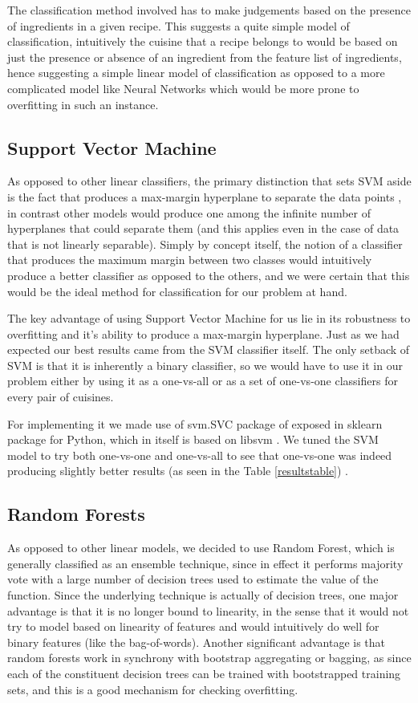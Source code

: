 \documentclass[prodmode,acmtap]{acmlarge}
\begin{document}
The classification method involved has to make judgements based on the presence of ingredients in a given recipe. This suggests a quite simple model of classification, intuitively the cuisine that a recipe belongs to would be based on just the presence or absence of an ingredient from the feature list of ingredients, hence suggesting a simple linear model of classification as opposed to a more complicated model like Neural Networks which would be more prone to overfitting in such an instance. 

\subsection{Support Vector Machine}

As opposed to other linear classifiers, the primary distinction that sets SVM aside is the fact that 
produces a max-margin hyperplane to separate the data points , in contrast other models would produce one among the infinite number of hyperplanes that could separate them (and this applies even in the case of data that is not linearly separable). Simply by concept itself, the notion of a classifier that produces the maximum margin between two classes would intuitively produce a better classifier as opposed to the others, and we were certain that this would be the ideal method for classification for our problem at hand.

The key advantage of using Support Vector Machine for us lie in its robustness to overfitting and it’s ability to produce a max-margin hyperplane. Just as we had expected our best results came from the SVM classifier itself. The only setback of SVM is that it is inherently a binary classifier, so we would have to use it in our problem either by using  it as a one-vs-all or as a set of one-vs-one classifiers for every pair of cuisines. 

For implementing it we made use of svm.SVC package of exposed in sklearn package for Python, which in itself is based on libsvm \cite{scikitsvc}. We tuned the SVM model to try both one-vs-one and one-vs-all to see that one-vs-one was indeed producing slightly better results (as seen in the Table \ref{resultstable}) . 

\subsection{Random Forests}

As opposed to other linear models, we decided to use Random Forest, which is generally classified as an ensemble technique, since in effect it performs majority vote with a large number of decision trees used to estimate the value of the function. Since the underlying technique is actually of decision trees, one major advantage is that it is no longer bound to linearity, in the sense that it would not try to model based on linearity of features and would intuitively do well for binary features (like the bag-of-words). Another significant advantage is that random forests work in synchrony with bootstrap aggregating or bagging, as since each of the constituent decision trees can be trained with bootstrapped training sets, and this is a good mechanism for checking overfitting.
\end{document}
